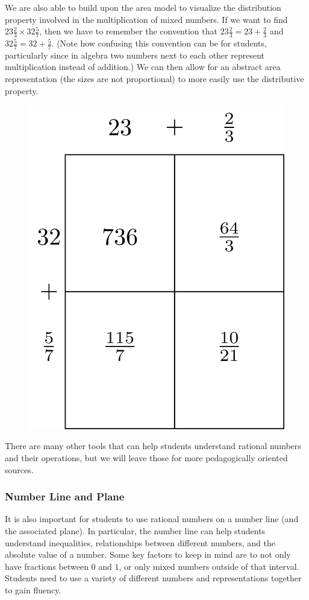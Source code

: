 \documentclass[
]{book}
\theoremstyle{definition}
\theoremstyle{definition}
\theoremstyle{definition}
\theoremstyle{remark}
\begin{document}
We are also able to build upon the area model to visualize the distribution property involved in the multiplication of mixed numbers. If we want to find \(23\frac{2}{3} \times 32 \frac{5}{7}\), then we have to remember the convention that \(23\frac{2}{3} = 23 + \frac{2}{3}\) and \(32\frac{5}{7}= 32 + \frac{5}{7}\). (Note how confusing this convention can be for students, particularly since in algebra two numbers next to each other represent multiplication instead of addition.) We can then allow for an abstract area representation (the sizes are not proportional) to more easily use the distributive property.

\begin{figure}

{\centering \includegraphics[width=0.5\linewidth]{tikz/area-model-Mixednumbers} 

}

\end{figure}

There are many other tools that can help students understand rational numbers and their operations, but we will leave those for more pedagogically oriented sources.

\hypertarget{number-line-and-plane}{%
\subsubsection{Number Line and Plane}\label{number-line-and-plane}}

It is also important for students to use rational numbers on a number line (and the associated plane). In particular, the number line can help students understand inequalities, relationships between different numbers, and the absolute value of a number. Some key factors to keep in mind are to not only have fractions between \(0\) and \(1\), or only mixed numbers outside of that interval. Students need to use a variety of different numbers and representations together to gain fluency.
\end{document}
